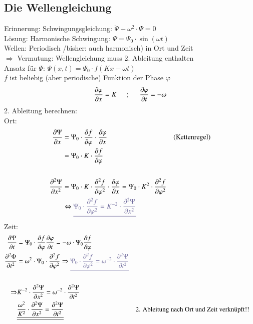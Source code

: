 \subsection{Die Wellengleichung}

Erinnerung: Schwingungsgleichung: $ \ddot{\Psi} + \omega^2 \cdot \Psi = 0 $ \\
Lösung: Harmonische Schwingung: $  \Psi = \Psi_0 \cdot \sin(\omega t) $ \\
Wellen: Periodisch /bisher: auch harmonisch) in Ort und Zeit \\
\indent $ \Rightarrow $  Vermutung: Wellengleichung muss 2. Ableitung enthalten\\
Ansatz für $ \Psi $: $ \Psi(x,t) = \Psi_0 \cdot f(Kx-\omega t) $\\
$ f $ ist beliebig (aber periodische) Funktion der Phase $ \varphi $\\
$$ \frac{\partial\varphi}{\partial x} = K \hspace{5mm};\hspace{5mm} \frac{\partial\varphi}{\partial t} = -\omega$$
2. Ableitung berechnen:\\
Ort:
\begin{align*}
\frac{\partial\Psi}{\partial x} &= \Psi_0 \cdot \frac{\partial f}{\partial \varphi} \cdot \frac{\partial\varphi}{\partial x} && \text{(Kettenregel)} \\
&= \Psi_0 \cdot K \cdot \frac{\partial f}{\partial \varphi} \\
\hfill \\
\frac{\partial^2 \Psi}{\partial x^2} &= \Psi_0 \cdot K \cdot \frac{\partial^2 f}{\partial \varphi^2} \cdot \frac{\partial\varphi}{\partial x} = \Psi_0 \cdot K^2 \cdot \frac{\partial^2 f}{\partial \varphi^2}\\
&\Leftrightarrow {\color{CadetBlue}\underline{\Psi_0 \cdot \frac{\partial^2 f}{\partial \varphi^2} = K^{-2} \cdot \frac{\partial^2\Psi}{\partial x^2}}}
\end{align*}
Zeit:
\begin{align*}
\frac{\partial\Psi}{\partial t} &= \Psi_0 \cdot \frac{\partial f}{\partial\varphi} \frac{\partial\varphi}{\partial t} = -\omega \cdot \Psi_0 \frac{\partial f}{\partial\varphi}\\
\frac{\partial^2\Phi}{\partial t^2} &= \omega^2\cdot\Psi_0\cdot\frac{\partial^2f}{\partial \varphi^2} \Rightarrow {\color{CadetBlue}\underline{\Psi_0\cdot\frac{\partial^2 f}{\partial \varphi^2} = \omega^{-2} \cdot \frac{\partial^2\Psi}{\partial t^2}}}\\
\hfill \\
\Rightarrow &K^{-2} \cdot \frac{\partial^2\Psi}{\partial x^2} = \omega^{-2} \cdot \frac{\partial^2\Psi}{\partial t^2}\\
&\underline{\underline{\frac{\omega^2}{K^2} \cdot \frac{\partial^2\Psi}{\partial x^2} = \frac{\partial^2\Psi}{\partial t^2}}} &&\text{2. Ableitung nach Ort und Zeit verknüpft!!}
\end{align*}

